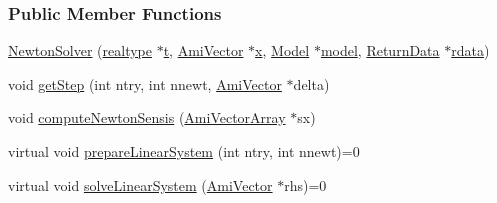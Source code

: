 \subsubsection*{Public Member Functions}
\begin{DoxyCompactItemize}
\item 
\mbox{\hyperlink{classamici_1_1_newton_solver_ab8ae759b768fe202522ca33df2770be0}{Newton\+Solver}} (\mbox{\hyperlink{namespaceamici_a1bdce28051d6a53868f7ccbf5f2c14a3}{realtype}} $\ast$\mbox{\hyperlink{classamici_1_1_newton_solver_ad94d61da9b85c1a151ffd8e228758c7c}{t}}, \mbox{\hyperlink{classamici_1_1_ami_vector}{Ami\+Vector}} $\ast$\mbox{\hyperlink{classamici_1_1_newton_solver_af64268982dd7b9be1690573763982e0b}{x}}, \mbox{\hyperlink{classamici_1_1_model}{Model}} $\ast$\mbox{\hyperlink{classamici_1_1_newton_solver_a7b56c3ca57dde73bdbc8dbe9772bca19}{model}}, \mbox{\hyperlink{classamici_1_1_return_data}{Return\+Data}} $\ast$\mbox{\hyperlink{classamici_1_1_newton_solver_a4c0807651f0594a186e8856f22e442cc}{rdata}})
\item 
void \mbox{\hyperlink{classamici_1_1_newton_solver_a7b71b3735b6ca62570266f9d6fce33cb}{get\+Step}} (int ntry, int nnewt, \mbox{\hyperlink{classamici_1_1_ami_vector}{Ami\+Vector}} $\ast$delta)
\item 
void \mbox{\hyperlink{classamici_1_1_newton_solver_a90d4823c7b8373d9aaccba80c930a7c7}{compute\+Newton\+Sensis}} (\mbox{\hyperlink{classamici_1_1_ami_vector_array}{Ami\+Vector\+Array}} $\ast$sx)
\item 
virtual void \mbox{\hyperlink{classamici_1_1_newton_solver_a4aed46b0343374f171f9b4b51fa009e7}{prepare\+Linear\+System}} (int ntry, int nnewt)=0
\item 
virtual void \mbox{\hyperlink{classamici_1_1_newton_solver_a761a5dc9e8cc7adfd4a392421df17c3d}{solve\+Linear\+System}} (\mbox{\hyperlink{classamici_1_1_ami_vector}{Ami\+Vector}} $\ast$rhs)=0
\end{DoxyCompactItemize}
